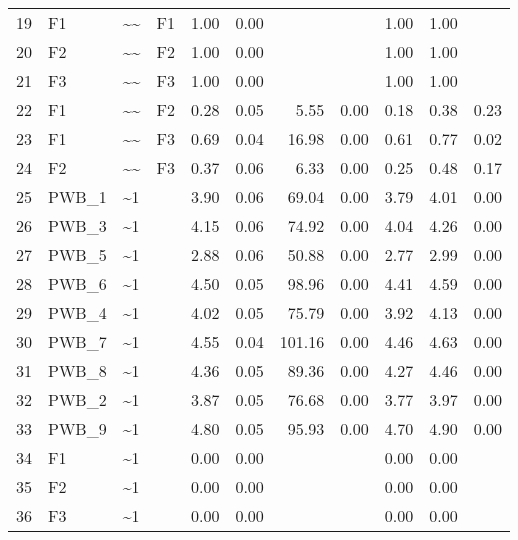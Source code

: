 \documentclass{article}
\begin{document}
\begin{table}[ht]
\begin{tabular}{rlllrrrrrrr}
  19 & F1 & \~{}\~{} & F1 & 1.00 & 0.00 &  &  & 1.00 & 1.00 &  \\ 
  20 & F2 & \~{}\~{} & F2 & 1.00 & 0.00 &  &  & 1.00 & 1.00 &  \\ 
  21 & F3 & \~{}\~{} & F3 & 1.00 & 0.00 &  &  & 1.00 & 1.00 &  \\ 
  22 & F1 & \~{}\~{} & F2 & 0.28 & 0.05 & 5.55 & 0.00 & 0.18 & 0.38 & 0.23 \\ 
  23 & F1 & \~{}\~{} & F3 & 0.69 & 0.04 & 16.98 & 0.00 & 0.61 & 0.77 & 0.02 \\ 
  24 & F2 & \~{}\~{} & F3 & 0.37 & 0.06 & 6.33 & 0.00 & 0.25 & 0.48 & 0.17 \\ 
  25 & PWB\_1 & \~{}1 &  & 3.90 & 0.06 & 69.04 & 0.00 & 3.79 & 4.01 & 0.00 \\ 
  26 & PWB\_3 & \~{}1 &  & 4.15 & 0.06 & 74.92 & 0.00 & 4.04 & 4.26 & 0.00 \\ 
  27 & PWB\_5 & \~{}1 &  & 2.88 & 0.06 & 50.88 & 0.00 & 2.77 & 2.99 & 0.00 \\ 
  28 & PWB\_6 & \~{}1 &  & 4.50 & 0.05 & 98.96 & 0.00 & 4.41 & 4.59 & 0.00 \\ 
  29 & PWB\_4 & \~{}1 &  & 4.02 & 0.05 & 75.79 & 0.00 & 3.92 & 4.13 & 0.00 \\ 
  30 & PWB\_7 & \~{}1 &  & 4.55 & 0.04 & 101.16 & 0.00 & 4.46 & 4.63 & 0.00 \\ 
  31 & PWB\_8 & \~{}1 &  & 4.36 & 0.05 & 89.36 & 0.00 & 4.27 & 4.46 & 0.00 \\ 
  32 & PWB\_2 & \~{}1 &  & 3.87 & 0.05 & 76.68 & 0.00 & 3.77 & 3.97 & 0.00 \\ 
  33 & PWB\_9 & \~{}1 &  & 4.80 & 0.05 & 95.93 & 0.00 & 4.70 & 4.90 & 0.00 \\ 
  34 & F1 & \~{}1 &  & 0.00 & 0.00 &  &  & 0.00 & 0.00 &  \\ 
  35 & F2 & \~{}1 &  & 0.00 & 0.00 &  &  & 0.00 & 0.00 &  \\ 
  36 & F3 & \~{}1 &  & 0.00 & 0.00 &  &  & 0.00 & 0.00 &  \\ 
   \hline
\end{tabular}
\end{table}
\end{document}
